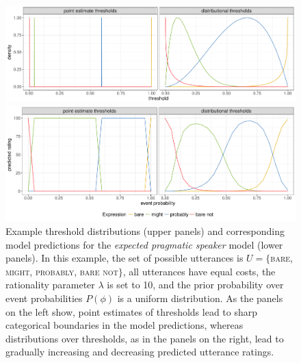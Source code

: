 \begin{figure}[th!]
\includegraphics[width=\textwidth]{plots/fig-5a-model-visualization-distributions.pdf}

\includegraphics[width=\textwidth]{plots/fig-5b-model-visualization-predictions.pdf}

\caption{Example threshold distributions (upper panels) and corresponding model predictions for the \textit{expected pragmatic speaker} model (lower panels). In this example, the set of possible utterances is $U=\{$\textsc{bare}, \textsc{might}, \textsc{probably}, \textsc{bare not}$\}$, all utterances have equal costs, the rationality parameter $\lambda$ is set to 10, and the prior probability over event probabilities $P(\phi)$ is a uniform distribution. As the panels on the left show, point estimates of thresholds lead to sharp categorical boundaries in the model predictions, whereas distributions over thresholds, as in the panels on the right, lead to gradually increasing and decreasing predicted utterance ratings. \label{fig:model-visualization}}
\end{figure}

